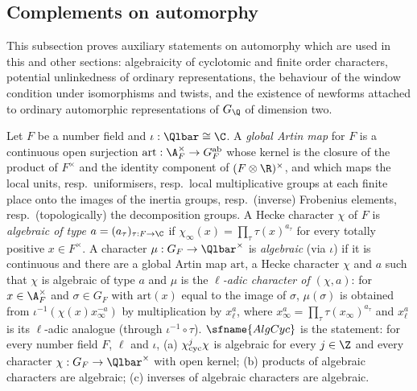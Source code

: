 \subsection{Complements on automorphy}\label{sec:pf:modularity:compl}

This subsection proves auxiliary statements on automorphy which are used in this and other sections: algebraicity of
cyclotomic and finite order characters, potential unlinkedness of ordinary representations, the behaviour of the window
condition under isomorphisms and twists, and the existence of newforms attached to ordinary automorphic representations
of $G_\Q$ of dimension two.

\begin{definition}\label{pf:modularity:algchar}
Let $F$ be a number field and $\iota:\Qlbar\cong\C$. A \emph{global Artin map} for $F$ is a continuous open surjection
$\mathrm{art}:\A_F^\times\to G_F^{\mathrm{ab}}$ whose kernel is the closure of the product of $F^\times$ and the identity
component of $(F\otimes\R)^\times$, and which maps the local units, resp.\ uniformisers, resp.\ local multiplicative groups
at each finite place onto the images of the inertia groups, resp.\ (inverse) Frobenius elements, resp.\ (topologically)
the decomposition groups. A Hecke character $\chi$ of $F$ is \emph{algebraic of type} $a=(a_\tau)_{\tau:F\to\C}$ if
$\chi_\infty(x)=\prod_\tau\tau(x)^{a_\tau}$ for every totally positive $x\in F^\times$. A character
$\mu:G_F\to\Qlbar^\times$ is \emph{algebraic} (via $\iota$) if it is continuous and there are a global Artin map
$\mathrm{art}$, a Hecke character $\chi$ and $a$ such that $\chi$ is algebraic of type $a$ and $\mu$ is the
\emph{$\ell$-adic character of $(\chi,a)$}: for $x\in\A_F^\times$ and $\sigma\in G_F$ with $\mathrm{art}(x)$ equal to the
image of $\sigma$, $\mu(\sigma)$ is obtained from $\iota^{-1}(\chi(x)x_\infty^{-a})$ by multiplication by $x_\ell^{a}$,
where $x_\infty^{a}=\prod_\tau\tau(x_\infty)^{a_\tau}$ and $x_\ell^a$ is its $\ell$-adic analogue (through
$\iota^{-1}\circ\tau$). $\sfname{AlgCyc}$ is the statement: for every number field $F$, $\ell$ and $\iota$, (a)
$\chi_{\mathrm{cyc}}^j\chi$ is algebraic for every $j\in\Z$ and every character $\chi:G_F\to\Qlbar^\times$ with open kernel;
(b) products of algebraic characters are algebraic; (c) inverses of algebraic characters are algebraic.
\end{definition}

